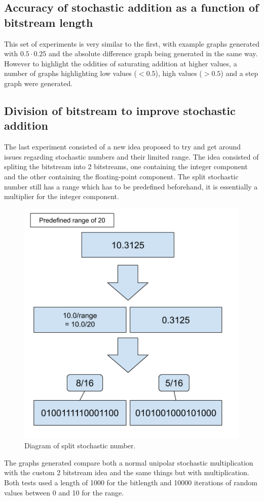 \documentclass[a4paper,oneside,phd,etd]{BYUPhys}
\begin{document}
\subsection{Accuracy of stochastic addition as a function of bitstream length}
This set of experiments is very similar to the first, with example graphs generated with $0.5\cdot 0.25$ and the absolute difference graph being generated in the same way. However to highlight the oddities of saturating addition at higher values, a number of graphs highlighting low values ($<0.5$), high values ($>0.5$) and a step graph were generated.

\subsection{Division of bitstream to improve stochastic addition}
The last experiment consisted of a new idea proposed to try and get around issues regarding stochastic numbers and their limited range. The idea consisted of spliting the bitstream into 2 bitstreams, one containing the integer component  and the other containing the floating-point component. The split stochastic number still has a range which has to be predefined beforehand, it is essentially a multiplier for the integer component.
\begin{figure}[H]
\centering
\includegraphics[scale=0.4]{pictures/Split-number.png}
\caption{Diagram of split stochastic number.}
\label{fig:split_stochastic}
\end{figure}
The graphs generated compare both a normal unipolar stochastic multiplication with the custom 2 bitstream idea and the same things but with multiplication. Both tests used a length of 1000 for the bitlength and 10000 iterations of random values between 0 and 10 for the range. 
\end{document}
